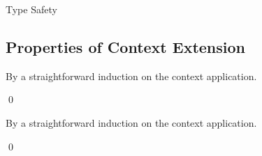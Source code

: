 Type Safety

\subsection{Properties of Context Extension}

\begin{lemma}[\DeclarationPreservationName]
  \label{lemma:\DeclarationPreservationName}
  \DeclarationPreservationBody
\end{lemma}
\proof

By a straightforward induction on the context application.

\qed

\begin{lemma}[\ReverseDeclarationPreservationName]
  \label{lemma:\ReverseDeclarationPreservationName}
  \ReverseDeclarationPreservationBody
\end{lemma}
\proof

By a straightforward induction on the context application.

\qed


\begin{lemma}[\DeclarationOrderPreservationName]
  \label{lemma:\DeclarationOrderPreservationName}
  \DeclarationOrderPreservationBody
\end{lemma}
\proof

